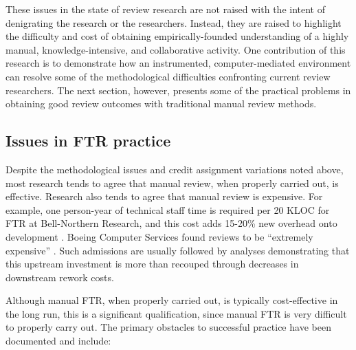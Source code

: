 These issues in the state of review research are not raised with the intent
of denigrating the research or the researchers.  Instead, they are raised
to highlight the difficulty and cost of obtaining empirically-founded
understanding of a highly manual, knowledge-intensive, and collaborative
activity.  One contribution of this research is to demonstrate how an
instrumented, computer-mediated environment can resolve some of the
methodological difficulties confronting current review researchers.  The
next section, however, presents some of the practical problems in
obtaining good review outcomes with traditional manual review methods.

\subsection{Issues in FTR practice}
\label{sec:issues-manual-review}

Despite the methodological issues and credit assignment variations noted
above, most research tends to agree that manual review, when properly
carried out, is effective.  Research also tends to agree that manual review
is expensive.  For example, one person-year of technical staff time is
required per 20 KLOC for FTR at Bell-Northern Research, and this cost adds
15-20\% new overhead onto development \cite{Russell91}. Boeing Computer
Services found reviews to be ``extremely expensive'' \cite{Glass82}. Such
admissions are usually followed by analyses demonstrating that this
upstream investment is more than recouped through decreases in downstream
rework costs. 

Although manual FTR, when properly carried out, is typically cost-effective
in the long run, this is a significant qualification, since manual FTR is
very difficult to properly carry out. The primary obstacles
to successful practice have been documented \cite{Deimel91,Freedman90,Gilb93}
and include:

